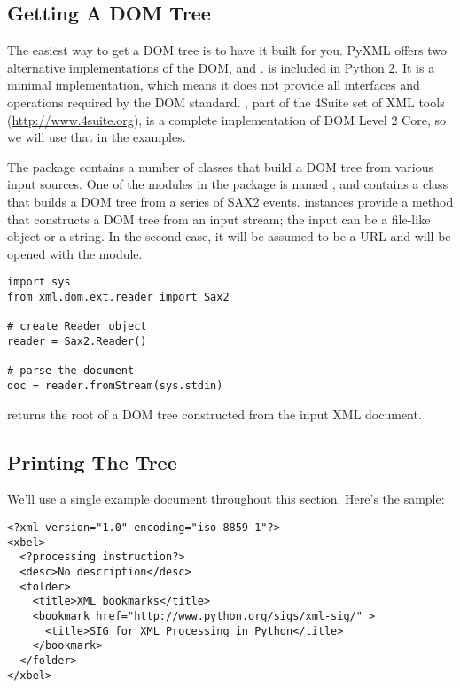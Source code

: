 \documentclass{howto}
\begin{document}
\subsection{Getting A DOM Tree}

The easiest way to get a DOM tree is to have it built for you. PyXML
offers two alternative implementations of the DOM,
 and .  is
included in Python 2. It is a minimal implementation, which means it
does not provide all interfaces and operations required by the DOM
standard.  , part of the 4Suite set of XML tools
(\url{http://www.4suite.org}), is a complete implementation of
DOM Level 2 Core, so we will use that in the examples.

The  package contains a number of classes
that build a DOM tree from various input sources.  One of the modules
in the  package is named , and contains a
 class that builds a DOM tree from a series of SAX2
events.   instances provide a 
method that constructs a DOM tree from an input stream; the input can
be a file-like object or a string.  In the second case, it will be
assumed to be a URL and will be opened with the 
module.

\begin{verbatim}
import sys
from xml.dom.ext.reader import Sax2

# create Reader object
reader = Sax2.Reader()

# parse the document
doc = reader.fromStream(sys.stdin)
\end{verbatim}

 returns the root of a DOM tree constructed from
the input XML document.


\subsection{Printing The Tree}

We'll use a single example document throughout this section.  Here's
the sample:

\begin{verbatim}
<?xml version="1.0" encoding="iso-8859-1"?>
<xbel>  
  <?processing instruction?>
  <desc>No description</desc>
  <folder>
    <title>XML bookmarks</title>
    <bookmark href="http://www.python.org/sigs/xml-sig/" >
      <title>SIG for XML Processing in Python</title>
    </bookmark>
  </folder>
</xbel>
\end{verbatim}
\end{document}
